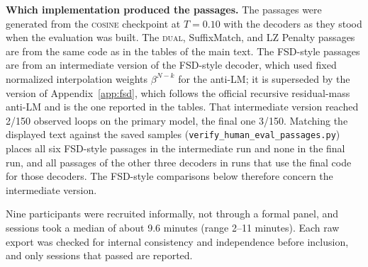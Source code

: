 \documentclass[11pt]{article}
\begin{document}
\textbf{Which implementation produced the passages.} The passages were generated from the \textsc{cosine} checkpoint at $T{=}0.10$ with the decoders as they stood when the evaluation was built. The \textsc{dual}, SuffixMatch, and LZ Penalty passages are from the same code as in the tables of the main text. The FSD-style passages are from an intermediate version of the FSD-style decoder, which used fixed normalized interpolation weights $\beta^{N-k}$ for the anti-LM; it is superseded by the version of Appendix~\ref{app:fsd}, which follows the official recursive residual-mass anti-LM and is the one reported in the tables. That intermediate version reached 2/150 observed loops on the primary model, the final one 3/150. Matching the displayed text against the saved samples (\texttt{verify\_\allowbreak{}human\_\allowbreak{}eval\_\allowbreak{}passages.py}) places all six FSD-style passages in the intermediate run and none in the final run, and all passages of the other three decoders in runs that use the final code for those decoders. The FSD-style comparisons below therefore concern the intermediate version.

Nine participants were recruited informally, not through a formal panel, and sessions took a median of about 9.6 minutes (range 2--11 minutes). Each raw export was checked for internal consistency and independence before inclusion, and only sessions that passed are reported.
\end{document}
